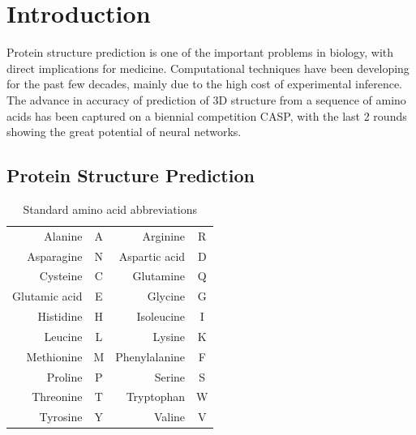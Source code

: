 \chapter{Introduction}

Protein structure prediction is one of the important problems in biology, with direct implications for medicine. Computational techniques have been developing for the past few decades, mainly due to the high cost of experimental inference. The advance in accuracy of prediction of 3D structure from a sequence of amino acids has been captured on a biennial competition CASP, with the last 2 rounds showing the great potential of neural networks.
    
\section{Protein Structure Prediction}%

\begin{table}
    \centering
    \begin{tabular}{r|c|r|c|}
        Alanine & A & Arginine & R \\
        Asparagine & N & Aspartic acid & D \\
        Cysteine & C & Glutamine & Q \\
        Glutamic acid & E & Glycine & G \\
        Histidine & H & Isoleucine & I \\
        Leucine & L & Lysine & K \\
        Methionine & M & Phenylalanine & F \\
        Proline & P & Serine & S \\
        Threonine & T & Tryptophan & W \\
        Tyrosine & Y & Valine & V
    \end{tabular}
    \caption{Standard amino acid abbreviations}
    \label{tab:aa_codes}
\end{table}

